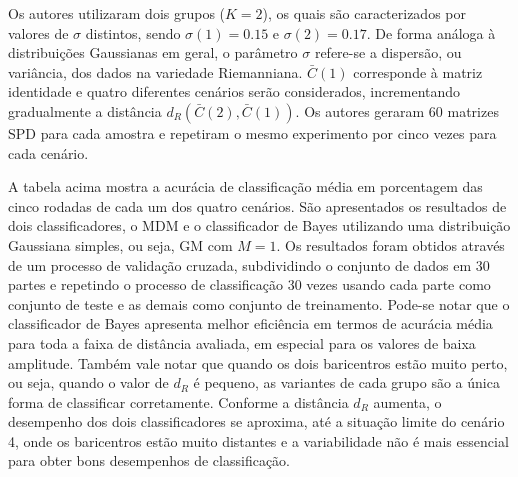 \documentclass[a4paper,titlepage]{article}
\begin{document}
Os autores utilizaram dois grupos ($K=2$), os quais são caracterizados por
valores de $\sigma$ distintos, sendo $\sigma(1) = 0.15$ e $\sigma(2) = 0.17$.
De forma análoga à distribuições Gaussianas em geral, o parâmetro $\sigma$
refere-se a dispersão, ou variância, dos dados na variedade Riemanniana.  
$\bar{C}(1)$ corresponde à matriz identidade e quatro diferentes cenários serão
considerados, incrementando gradualmente a distância
$d_R(\bar{C}(2), \bar{C}(1))$. Os autores geraram 60 matrizes SPD para cada
amostra e repetiram o mesmo experimento por cinco vezes para cada cenário.

\begin{center}
  \vspace{1em}
  \vspace{1em}
\end{center}

A tabela acima mostra a acurácia de classificação média em porcentagem das
cinco rodadas de cada um dos quatro cenários. São apresentados os resultados
de dois classificadores, o MDM e o classificador de Bayes utilizando uma
distribuição Gaussiana simples, ou seja, GM com $M=1$. Os resultados foram
obtidos através de um processo de validação cruzada, subdividindo o conjunto de
dados em 30 partes e repetindo o processo de classificação 30 vezes usando cada
parte como conjunto de teste e as demais como conjunto de treinamento.
Pode-se notar que o classificador de Bayes apresenta melhor eficiência em
termos de acurácia média para toda a faixa de distância avaliada, em especial
para os valores de baixa amplitude. Também vale notar que quando os dois
baricentros estão muito perto, ou seja, quando o valor de $d_R$ é pequeno,
as variantes de cada grupo são a única forma de classificar corretamente.
Conforme a distância $d_R$ aumenta, o desempenho dos dois classificadores se
aproxima, até a situação limite do cenário 4, onde os baricentros estão muito
distantes e a variabilidade não é mais essencial para obter bons desempenhos de
classificação.
\end{document}
